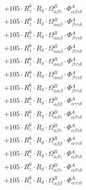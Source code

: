 \documentclass{article}
\begin{document}
\begin{subequations}
\begin{gather}
\begin{array}{c}
 \\[0.2em] 		 + 105 \cdot R_{z}^{6} \cdot R_{\delta{}} \cdot \Omega{}^{B}_{\alpha{}\beta{}\gamma{}} \cdot \Phi{}^{A}_{\alpha{}\beta{}\gamma{}\delta{}} 
 \\[0.2em] 		 + 105 \cdot R_{z}^{6} \cdot R_{\delta{}} \cdot \Omega{}^{B}_{\alpha{}\alpha{}\beta{}} \cdot \Phi{}^{A}_{\beta{}\gamma{}\gamma{}\delta{}} 
 \\[0.2em] 		 + 105 \cdot R_{z}^{6} \cdot R_{\delta{}} \cdot \Omega{}^{B}_{\alpha{}\alpha{}\beta{}} \cdot \Phi{}^{A}_{\beta{}\gamma{}\gamma{}\delta{}} 
 \\[0.2em] 		 + 105 \cdot R_{z}^{6} \cdot R_{\delta{}} \cdot \Omega{}^{B}_{\alpha{}\alpha{}\beta{}} \cdot \Phi{}^{A}_{\beta{}\gamma{}\gamma{}\delta{}} 
 \\[0.2em] 		 + 105 \cdot R_{z}^{6} \cdot R_{\delta{}} \cdot \Omega{}^{B}_{\alpha{}\alpha{}\beta{}} \cdot \Phi{}^{A}_{\beta{}\gamma{}\gamma{}\delta{}} 
 \\[0.2em] 		 + 105 \cdot R_{z}^{6} \cdot R_{\delta{}} \cdot \Omega{}^{B}_{\alpha{}\alpha{}\beta{}} \cdot \Phi{}^{A}_{\beta{}\gamma{}\gamma{}\delta{}} 
 \\[0.2em] 		 + 105 \cdot R_{z}^{6} \cdot R_{\delta{}} \cdot \Omega{}^{B}_{\alpha{}\alpha{}\beta{}} \cdot \Phi{}^{A}_{\beta{}\gamma{}\gamma{}\delta{}} 
 \\[0.2em] 		 + 105 \cdot R_{z}^{6} \cdot R_{\delta{}} \cdot \Omega{}^{B}_{\alpha{}\beta{}\beta{}} \cdot \Phi{}^{A}_{\alpha{}\gamma{}\gamma{}\delta{}} 
 \\[0.2em] 		 + 105 \cdot R_{z}^{6} \cdot R_{\delta{}} \cdot \Omega{}^{B}_{\alpha{}\beta{}\gamma{}} \cdot \Phi{}^{A}_{\alpha{}\beta{}\gamma{}\delta{}} 
 \\[0.2em] 		 + 105 \cdot R_{z}^{6} \cdot R_{\delta{}} \cdot \Omega{}^{B}_{\alpha{}\beta{}\gamma{}} \cdot \Phi{}^{A}_{\alpha{}\beta{}\gamma{}\delta{}} 
 \\[0.2em] 		 + 105 \cdot R_{z}^{6} \cdot R_{\delta{}} \cdot \Omega{}^{B}_{\alpha{}\beta{}\beta{}} \cdot \Phi{}^{A}_{\alpha{}\gamma{}\gamma{}\delta{}} 
 \\[0.2em] 		 + 105 \cdot R_{z}^{6} \cdot R_{\delta{}} \cdot \Omega{}^{B}_{\alpha{}\beta{}\gamma{}} \cdot \Phi{}^{A}_{\alpha{}\beta{}\gamma{}\delta{}} 
 \\[0.2em] 		 + 105 \cdot R_{z}^{6} \cdot R_{\delta{}} \cdot \Omega{}^{B}_{\alpha{}\beta{}\gamma{}} \cdot \Phi{}^{A}_{\alpha{}\beta{}\gamma{}\delta{}} 
 \\[0.2em] 		 + 105 \cdot R_{z}^{6} \cdot R_{\delta{}} \cdot \Omega{}^{B}_{\alpha{}\beta{}\beta{}} \cdot \Phi{}^{A}_{\alpha{}\gamma{}\gamma{}\delta{}} 

\end{array}
\end{gather}
\end{subequations}
\end{document}
